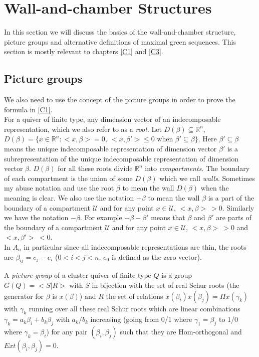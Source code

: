\section{Wall-and-chamber Structures}
\indent In this section we will discuss the basics of the wall-and-chamber structure, picture groups and alternative definitions of maximal green sequences. This section is mostly relevant to chapters \ref{C1} and \ref{C3}.\\
\subsection{Picture groups}
\indent We also need to use the concept of the picture groups in order to prove the formula in \ref{C1}.\\
\indent For a quiver of finite type, any dimension vector of an indecomposable representation, which we also refer to as a \textit{root}. Let $D(\beta)\subseteq\mathbb{R}^n$, $D(\beta)= \{x\in\mathbb{R}^n: <x,\beta>=0,\ <x,\beta'>\leq 0\text{ when }\beta'\subseteq\beta\}$. Here $\beta'\subseteq\beta$ means the unique indecomposable representation of dimension vector $\beta'$ is a subrepresentation of the unique indecomposable representation of dimension vector $\beta$. $D(\beta)$ for all these roots divide $\mathbb{R}^n$ into \textit{compartments}. The boundary of each compartment is the union of some $D(\beta)$ which we call \textit{walls}.\cite{IT17}\cite{IOTW4} Sometimes my abuse notation and use the root $\beta$ to mean the wall $D(\beta)$ when the meaning is clear. We also use the notation $+\beta$ to mean the wall $\beta$ is a part of the boundary of a compartment $\mathcal{U}$ and for any point $x\in\mathcal{U}$, $<x,\beta>\ >0$. Similarly we have the notation $-\beta$. For example $+\beta-\beta'$ means that $\beta$ and $\beta'$ are parts of the boundary of a compartment $\mathcal{U}$ and for any point $x\in\mathcal{U}$, $<x,\beta>\ >0$ and $<x,\beta'>\ <0$.\\
\indent In $A_n$ in particular since all indecomposable representations are thin, the roots are $\beta_{ij}=e_j-e_i$ ($0<i<j<n$, $e_0$ is defined as the zero vector).\\
\begin{definition}
A \textit{picture group} of a cluster quiver of finite type $Q$ is a group $G(Q)=<S|R>$ with $S$ in bijection with the set of real Schur roots (the generator for $\beta$ is $x(\beta)$) and $R$ the set of relations $x(\beta_i)x(\beta_j)=\Pi x(\gamma_k)$ with $\gamma_k$ running over all these real Schur roots which are linear combinations $\gamma_k = a_k\beta_i+b_k\beta_j$ with $a_k/b_k$ increasing (going from 0/1 where $\gamma_1=\beta_j$ to 1/0 where $\gamma_k=\beta_i$) for any pair $(\beta_i,\beta_j)$ such that they are Hom-orthogonal and $Ext(\beta_i,\beta_j)=0$. \cite{IT17}\\
\end{definition}

